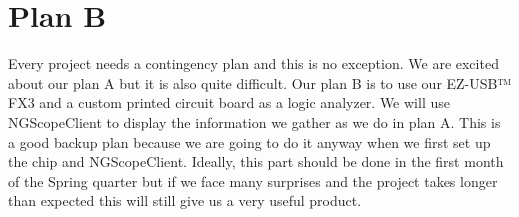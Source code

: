 \section{Plan B}
Every project needs a contingency plan and this is no exception. We are excited about our plan A but it is also quite difficult. Our plan B is to use our EZ-USB™ FX3 and a custom printed circuit board as a logic analyzer. We will use NGScopeClient to display the information we gather as we do in plan A. This is a good backup plan because we are going to do it anyway when we first set up the chip and NGScopeClient. Ideally, this part should be done in the first month of the Spring quarter but if we face many surprises and the project takes longer than expected this will still give us a very useful product. 